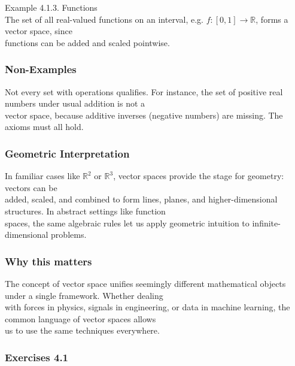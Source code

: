 \documentclass[
  12pt,
  a4paper,
]{article}
\begin{document}
Example 4.1.3. Functions\\
The set of all real-valued functions on an interval, e.g.
\(f: [0,1] \to \mathbb{R}\), forms a vector space, since\\
functions can be added and scaled pointwise.

\subsubsection{Non-Examples}\label{non-examples}

Not every set with operations qualifies. For instance, the set of
positive real numbers under usual addition is not a\\
vector space, because additive inverses (negative numbers) are missing.
The axioms must all hold.

\subsubsection{Geometric
Interpretation}\label{geometric-interpretation-4}

In familiar cases like \(\mathbb{R}^2\) or \(\mathbb{R}^3\), vector
spaces provide the stage for geometry: vectors can be\\
added, scaled, and combined to form lines, planes, and
higher-dimensional structures. In abstract settings like function\\
spaces, the same algebraic rules let us apply geometric intuition to
infinite-dimensional problems.

\subsubsection{Why this matters}\label{why-this-matters-12}

The concept of vector space unifies seemingly different mathematical
objects under a single framework. Whether dealing\\
with forces in physics, signals in engineering, or data in machine
learning, the common language of vector spaces allows\\
us to use the same techniques everywhere.

\subsubsection{Exercises 4.1}\label{exercises-41}
\end{document}
